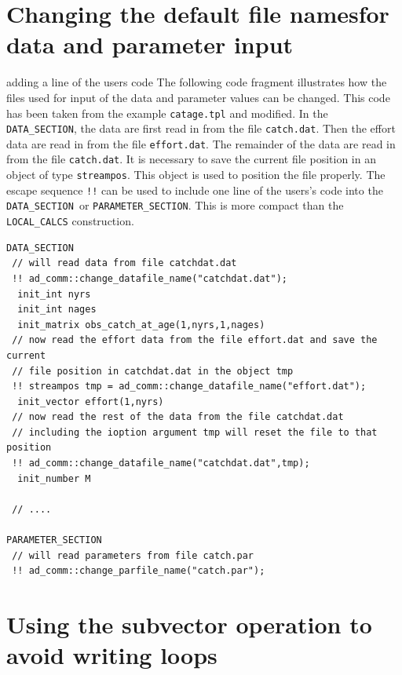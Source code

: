 \documentclass{admbmanual}
\newcommand\DS{\texttt{DATA\_SECTION}}
\newcommand\PS{\texttt{PARAMETER\_SECTION}}
\begin{document}
\section{Changing the default file names\br for data and parameter input}

 {adding a line of the users code}
The following code fragment illustrates how the files used for input 
of the data and parameter values can be changed. This code has been taken from
the example \texttt{catage.tpl} and modified. In the \DS, the data are first read 
in from the file \texttt{catch.dat}. Then the effort data are read in from the
file \texttt{effort.dat}. The remainder of the data are read in from the
file \texttt{catch.dat}. It is necessary to save the current file position in
an object of type \texttt{streampos}. This object is used to 
position the file properly.
The escape sequence {\tt!!} can be used to include one line of the users's
code into the \DS\ or \PS.  This is more compact than the \texttt{LOCAL\_CALCS}
construction.
\begin{lstlisting}
DATA_SECTION
 // will read data from file catchdat.dat
 !! ad_comm::change_datafile_name("catchdat.dat");
  init_int nyrs  
  init_int nages
  init_matrix obs_catch_at_age(1,nyrs,1,nages)
 // now read the effort data from the file effort.dat and save the current
 // file position in catchdat.dat in the object tmp
 !! streampos tmp = ad_comm::change_datafile_name("effort.dat");
  init_vector effort(1,nyrs)
 // now read the rest of the data from the file catchdat.dat 
 // including the ioption argument tmp will reset the file to that position
 !! ad_comm::change_datafile_name("catchdat.dat",tmp);
  init_number M

 // ....

PARAMETER_SECTION
 // will read parameters from file catch.par
 !! ad_comm::change_parfile_name("catch.par");
\end{lstlisting}


\section{Using the subvector operation to avoid writing loops}
\end{document}
